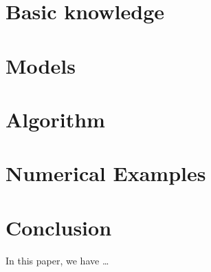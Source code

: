 \documentclass[3p, a4paper, 11pt]{elsarticle}
\begin{document}
\section{Basic knowledge}\label{sec:sec-2}



\section{Models}\label{sec:sec-3}



\section{Algorithm}\label{sec:sec-4}



\section{Numerical Examples}\label{sec:sec-5}



\section{Conclusion}\label{sec:sec-6}
In this paper, we have \dots
\end{document}
